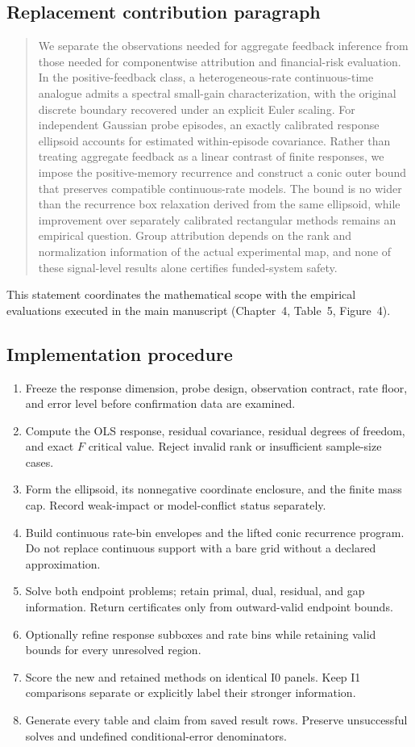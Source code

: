 \documentclass[11pt,a4paper]{article}
\theoremstyle{definition}\newtheorem{definition}[theorem]{Definition}
\theoremstyle{remark}\newtheorem{remark}[theorem]{Remark}
\begin{document}
\subsection{Replacement contribution paragraph}
\begin{quote}
We separate the observations needed for aggregate feedback inference from those needed for componentwise attribution and financial-risk evaluation. In the positive-feedback class, a heterogeneous-rate continuous-time analogue admits a spectral small-gain characterization, with the original discrete boundary recovered under an explicit Euler scaling. For independent Gaussian probe episodes, an exactly calibrated response ellipsoid accounts for estimated within-episode covariance. Rather than treating aggregate feedback as a linear contrast of finite responses, we impose the positive-memory recurrence and construct a conic outer bound that preserves compatible continuous-rate models. The bound is no wider than the recurrence box relaxation derived from the same ellipsoid, while improvement over separately calibrated rectangular methods remains an empirical question. Group attribution depends on the rank and normalization information of the actual experimental map, and none of these signal-level results alone certifies funded-system safety.
\end{quote}
This statement coordinates the mathematical scope with the empirical evaluations executed in the main manuscript (Chapter~4, Table~5, Figure~4).

\subsection{Implementation procedure}
\begin{enumerate}
\item Freeze the response dimension, probe design, observation contract, rate floor, and error level before confirmation data are examined.
\item Compute the OLS response, residual covariance, residual degrees of freedom, and exact $F$ critical value. Reject invalid rank or insufficient sample-size cases.
\item Form the ellipsoid, its nonnegative coordinate enclosure, and the finite mass cap. Record weak-impact or model-conflict status separately.
\item Build continuous rate-bin envelopes and the lifted conic recurrence program. Do not replace continuous support with a bare grid without a declared approximation.
\item Solve both endpoint problems; retain primal, dual, residual, and gap information. Return certificates only from outward-valid endpoint bounds.
\item Optionally refine response subboxes and rate bins while retaining valid bounds for every unresolved region.
\item Score the new and retained methods on identical I0 panels. Keep I1 comparisons separate or explicitly label their stronger information.
\item Generate every table and claim from saved result rows. Preserve unsuccessful solves and undefined conditional-error denominators.
\end{enumerate}
\end{document}
